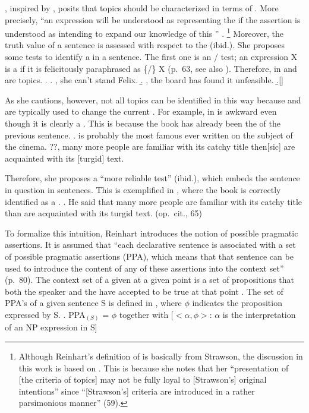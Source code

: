 ,
inspired by ,
posits that topics should be characterized in terms of .
More precisely,
``an expression will be understood as representing the 
if the assertion is understood as intending to expand our knowledge of this '' \cite[59]{reinhart81}.%
  \footnote{
  Although Reinhart's definition of  is basically from Strawson,
  the discussion in this work is based on .
  This is because she notes that her ``presentation of [the criteria of topics] may not be fully loyal to [Strawson's] original intentions'' since ``[Strawson's] criteria are introduced in a rather parsimonious manner'' (59).
  }
Moreover, the truth value of a sentence is assessed with respect to the  ({ibid.}).
She proposes some tests to identify a  in a sentence.
The first one is an / test;
an expression X is a  if it is felicitously paraphrased as \{/\} X (p.~63, see also \citet{kuno72,kuno76,gundel74}).
Therefore,  in \Next[a] and  \Next[b] are topics.
%
\ex. \a. , she can't stand Felix.
     \b. , the board has found it unfeasible.
     \b.[] \hfill{\cite[59]{reinhart81}}

As she cautions, however,
not all topics can be identified in this way
because  and  are typically used to change the current  \cite{keenanschieffelin76,durantiochs79}.
For example,  in \Next is awkward even though it is clearly a .
This is because the book has already been the  of the previous sentence.
%
\ex.  is probably the most famous ever written on the subject of the cinema.
 ??, many more people are familiar with its catchy title then[sic] are acquainted with its [turgid] text.
 \hfill{\cite[64]{reinhart81}}

Therefore, she proposes a ``more reliable test'' (ibid.),
which embeds the sentence in question in  sentences.
This is exemplified in \Next,
where the book is correctly identified as a .
%
\ex. He said  that many more people are familiar with its catchy title than are acquainted with its turgid text.
  \hfill{(op.~cit., 65)}


To formalize this intuition, Reinhart introduces the notion of possible pragmatic assertions.
It is assumed that ``each declarative sentence is associated with a set of possible pragmatic assertions (PPA), which means that that sentence can be used to introduce the content of any of these assertions into the context set'' (p.~80).
The context set of a given  at a given point is a set of propositions that both the speaker and the  have accepted to be true at that point \cite{stalnaker78}.
The set of PPA's of a given sentence S is defined in \Next,
where $\phi$ indicates the proposition expressed by S.
%
\ex. \label{BackExPPA} PPA$_{(S)}$ = $\phi$ together with [$<\alpha,\phi>$: $\alpha$ is the interpretation of an NP expression in S]
   \hfill{\cite[80-81]{reinhart81}}

